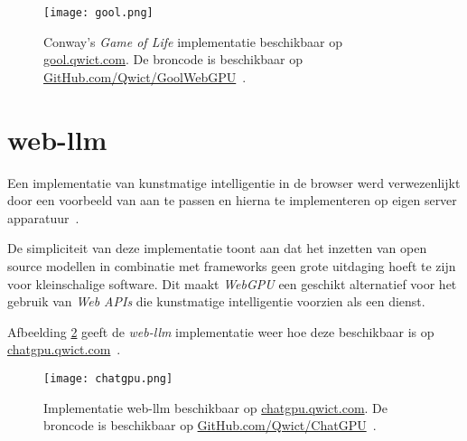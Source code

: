 \begin{figure}
    \texttt{[image: gool.png]}
    \caption[Conway's \textit{Game of Life} implementatie~\autocite{Qwict2024}]{
        Conway's \textit{Game of Life} implementatie beschikbaar op \href{https://gool.qwict.com}{gool.qwict.com}. De broncode is beschikbaar op \href{https://github.com/qwict/GoolWebGPU}{GitHub.com/Qwict/GoolWebGPU}~\autocite{google2023, Qwict2024}.
    }
    \label{fig:Conway's Game of Life}
\end{figure}

\break{}

\iffalse
TODO Dit moet verder in detail worden beschreven
\fi

\section{web-llm}
\label{sec:chatgpu}

Een implementatie van kunstmatige intelligentie in de browser werd verwezenlijkt door een voorbeeld van \textcite{mlcai2023} aan te passen en hierna te implementeren op eigen server apparatuur~\autocite{Qwict2024a}.

\bigbreak{}

De simpliciteit van deze implementatie toont aan dat het inzetten van open source modellen in combinatie met frameworks geen grote uitdaging hoeft te zijn voor kleinschalige software. Dit maakt \textit{WebGPU} een geschikt alternatief voor het gebruik van \textit{Web APIs} die kunstmatige intelligentie voorzien als een dienst.

\bigbreak{}

Afbeelding \ref{fig:Implementatie web-llm} geeft de \textit{web-llm} implementatie weer hoe deze beschikbaar is op \href{https://chatgpu.qwict.com}{chatgpu.qwict.com}~\autocite{Qwict2024a}.

\begin{figure}
    \texttt{[image: chatgpu.png]}
    \caption[Implementatie web-llm~\autocite{mlcai2023, Qwict2024a}]{
        Implementatie web-llm beschikbaar op \href{https://chatgpu.qwict.com}{chatgpu.qwict.com}. De broncode is beschikbaar op \href{https://github.com/qwict/chatgpu}{GitHub.com/Qwict/ChatGPU}~\autocite{mlcai2023, Qwict2024a}.
    }
    \label{fig:Implementatie web-llm}
\end{figure}